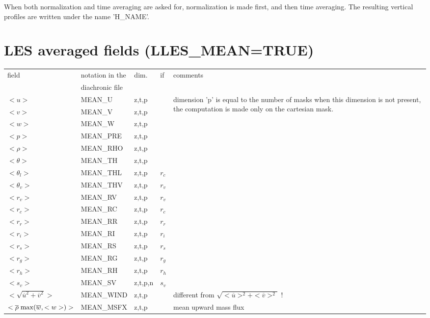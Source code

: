 When both normalization and time averaging are asked for,
normalization is made first, and then time averaging. The resulting
vertical profiles are written under the name 'H\_NAME'.\\

\section{LES averaged fields (LLES\_MEAN=TRUE)}


\begin{center}
\begin{makeimage}
\begin{tabular}{||p{6cm}|>{\centering}p{2.5cm}|>{\centering}p{1.5cm}|>{\centering}p{0.5cm}|p{5cm }||}
\hline
\hline
field & notation in the & dim. &   if  & comments \\
      & diachronic file & &  & \\
\hline
\hline
$<u>$ & MEAN\_U & z,t,p & &\multirow{15}{5cm}{dimension 'p' is equal to the  number of masks when this dimension is not present, the computation is made only on the cartesian mask.}\\
\cline{1-4}
$<v>$ & MEAN\_V &z,t,p &   &  \\
\cline{1-4}
$<w>$  & MEAN\_W &z,t,p &   & \\
\cline{1-4}
$<p>$   & MEAN\_PRE &z,t,p &   & \\
\cline{1-4}
$<\rho>$   & MEAN\_RHO &z,t,p &   & \\
\cline{1-4}
$<\theta>$   & MEAN\_TH &z,t,p &   &\\
\cline{1-4}
$<\theta_l>$   & MEAN\_THL &z,t,p &  $r_c$  &\\
\cline{1-4}
$<\theta_v>$   & MEAN\_THV &z,t,p &  $r_v$  &\\
\cline{1-4}
$<r_v>$   & MEAN\_RV &z,t,p &  $r_v$  &\\
\cline{1-4}
$<r_c>$   & MEAN\_RC &z,t,p &  $r_c$  &\\
\cline{1-4}
$<r_r>$   & MEAN\_RR &z,t,p &  $r_r$  &\\
\cline{1-4}
$<r_i>$   & MEAN\_RI &z,t,p &  $r_i$  &\\
\cline{1-4}
$<r_s>$   & MEAN\_RS &z,t,p &  $r_s$  &\\
\cline{1-4}
$<r_g>$   & MEAN\_RG &z,t,p &  $r_g$  &\\
\cline{1-4}
$<r_h>$   & MEAN\_RH &z,t,p &  $r_h$  &\\
\cline{1-4}
$<s_v>$   & MEAN\_SV &z,t,p,n &  $s_v$  &\\
\hline
$<\sqrt{\overline{u}^2+\overline{v}^2}>$   & MEAN\_WIND &z,t,p &   & different from $\sqrt{<\overline{u}>^2+<\overline{v}>^2}$ !\\
\hline
$<\overline{\rho} \;{\rm max}(\overline{w},<w>) >$  & MEAN\_MSFX &z,t,p &   & mean upward mass flux\\
\hline
\hline
\end{tabular}
\end{makeimage}
\end{center}

